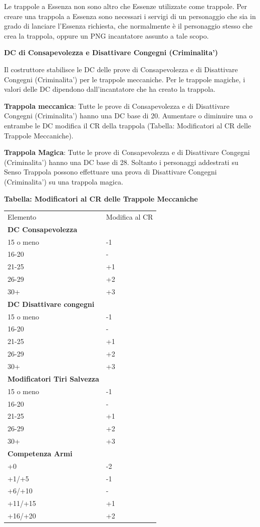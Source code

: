 \documentclass[a4paper,11pt,twoside,openany]{book}
\begin{document}
{Le trappole a Essenza non sono altro che Essenze utilizzate come trappole. Per creare una trappola a Essenza sono necessari i servigi di un personaggio che sia in grado di lanciare l'Essenza richiesta, che normalmente è il personaggio stesso che crea la trappola, oppure un PNG incantatore assunto a tale scopo.

\textbf{DC di Consapevolezza e Disattivare Congegni (Criminalita')}

Il costruttore stabilisce le DC delle prove di Consapevolezza e di Disattivare Congegni (Criminalita') per le trappole meccaniche. Per le trappole magiche, i valori delle DC dipendono dall'incantatore che ha creato la trappola.

\textbf{Trappola meccanica}: Tutte le prove di Consapevolezza e di Disattivare Congegni (Criminalita') hanno una DC base di 20. Aumentare o diminuire una o entrambe le DC modifica il CR della trappola (Tabella: Modificatori al CR delle Trappole Meccaniche). 

\textbf{Trappola Magica}: Tutte le prove di Consapevolezza e di Disattivare Congegni (Criminalita') hanno una DC base di 28. Soltanto i personaggi addestrati su Senso Trappola possono effettuare una prova di Disattivare Congegni (Criminalita') su una trappola magica.

\pagebreak

\textbf{Tabella: Modificatori al CR delle Trappole Meccaniche}


\begin{tabular}{ll}
\toprule
	Elemento & Modifica al CR\tabularnewline
\textbf{DC Consapevolezza}& \\
15 o meno & -1\\
16-20 &-\\
21-25 &+1\\
26-29 &+2\\
30+ &+3\\
\textbf{DC Disattivare congegni}
&\\
15 o meno &-1\\
16-20 &-\\
21-25 &+1\\
26-29 &+2\\
30+ &+3\\
\textbf{Modificatori Tiri Salvezza}&\\
15 o meno &-1\\
16-20 &-\\
21-25 &+1\\
26-29 &+2\\
30+ &+3\\
\textbf{Competenza Armi}&\\
+0 &-2\\
+1/+5 &-1\\
+6/+10 &-\\
+11/+15 &+1\\
+16/+20 &+2\\


\end{tabular}}
\end{document}
